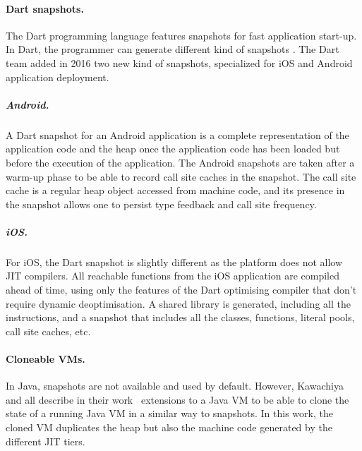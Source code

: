 \documentclass[a4paper,12pt,twoside]{../includes/ThesisStyle}
\begin{document}
\paragraph{Dart snapshots.}
The Dart programming language features snapshots for fast application start-up. In Dart, the programmer can generate different kind of snapshots \cite{Anna13a}. The Dart team added in 2016 two new kind of snapshots, specialized for iOS and Android application deployment.

\subparagraph{Android.} A Dart snapshot for an Android application is a complete representation of the application code and the heap once the application code has been loaded but before the execution of the application. The Android snapshots are taken after a warm-up phase to be able to record call site caches in the snapshot. The call site cache is a regular heap object accessed from machine code, and its presence in the snapshot allows one to persist type feedback and call site frequency. %

\subparagraph{iOS.} For iOS, the Dart snapshot is slightly different as the platform does not allow JIT compilers. All reachable functions from the iOS application are compiled ahead of time, using only the features of the Dart optimising compiler that don't require dynamic deoptimisation. A shared library is generated, including all the instructions, and a snapshot that includes all the classes, functions, literal pools, call site caches, etc.

\paragraph{Cloneable VMs.}
In Java, snapshots are not available and used by default. However, Kawachiya and all describe in their work~\cite{Kawa07a} extensions to a Java VM to be able to clone the state of a running Java VM in a similar way to snapshots. In this work, the cloned VM duplicates the heap but also the machine code generated by the different JIT tiers.


\end{document}
